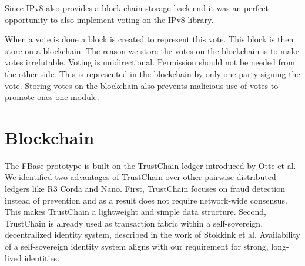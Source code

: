 Since IPv8 also provides a block-chain storage back-end it was an perfect opportunity to also implement voting on the IPv8 library.

When a vote is done a block is created to represent this vote. This block is then store on a blockchain. The reason we store the votes on the blockchain is to make votes irrefutable. Voting is unidirectional. Permission should not be needed from the other side. This is represented in the blockchain by only one party signing the vote. Storing votes on the blockchain also prevents malicious use of votes to promote ones one module.

\section{Blockchain}

The FBase prototype is built on the
TrustChain ledger introduced by Otte et al. We identified
two advantages of TrustChain over other pairwise distributed
ledgers like R3 Corda and Nano. First, TrustChain focuses
on fraud detection instead of prevention and as a result does
not require network-wide consensus. This makes TrustChain
a lightweight and simple data structure. Second, TrustChain is
already used as transaction fabric within a self-sovereign, decentralized identity system, described in the work of Stokkink
et al. Availability of a self-sovereign identity system
aligns with our requirement for strong, long-lived identities.